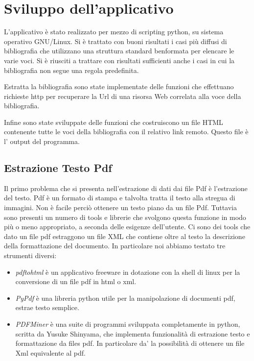 \section{Sviluppo dell'applicativo}


L'applicativo è stato realizzato per mezzo di scripting python, su sistema operativo GNU/Linux. Si è trattato con buoni risultati i casi più diffusi di bibliografia che utilizzano una struttura standard benformata per elencare le varie voci. Si è riusciti a trattare con risultati sufficienti anche i casi in cui la bibliografia non segue una regola predefinita.

Estratta la bibliografia sono state implementate delle funzioni che effettuano richieste http per recuperare la Url di una risorsa Web correlata alla voce della bibliografia. 

Infine sono state sviluppate delle funzioni che costruiscono un file HTML contenente tutte le voci della bibliografia con il relativo link remoto. Questo file è l' output del programma.

\subsection{Estrazione Testo Pdf}
Il primo problema che si presenta nell'estrazione di dati dai file Pdf è l'estrazione del testo. Pdf è un formato di stampa e talvolta tratta il testo alla stregua di immagini. Non è facile perciò ottenere un testo piano da un file Pdf. Tuttavia sono presenti un numero di tools e librerie che svolgono questa funzione in modo più o meno appropriato, a seconda delle esigenze dell'utente. Ci sono dei tools che dato un file pdf estraggono un file XML che contiene oltre al testo la descrizione della formattazione del documento. 
In particolare noi abbiamo testato tre strumenti diversi:
\begin{itemize}
 \item \textit{pdftohtml} è un applicativo freeware in dotazione con la shell di linux per la conversione di un file pdf in html o xml.
 \item \textit{PyPdf} è una libreria python utile per la manipolazione di documenti pdf, estrae testo semplice.
 \item \textit{PDFMiner} è una suite di programmi sviluppata completamente in python, scritta da Yusuke Shinyama, che implementa funzionalità di estrazione testo e formattazione da files pdf. In particolare da' la possibilità di ottenere un file Xml equivalente al pdf.
\end{itemize}

